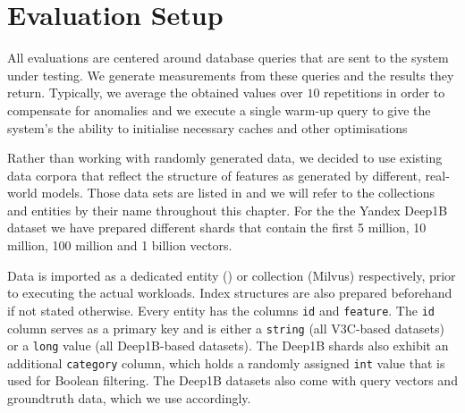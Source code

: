 \section{Evaluation Setup}

All evaluations are centered around database queries that are sent to the system under testing. We generate measurements from these queries and the results they return. Typically, we average the obtained values over $10$ repetitions in order to compensate for anomalies and we execute a single warm-up query to give the system's the ability to initialise necessary caches and other optimisations 

Rather than working with randomly generated data, we decided to use existing data corpora that reflect the structure of features as generated by different, real-world models. Those data sets are listed in  and we will refer to the collections and entities by their name throughout this chapter. For the the Yandex Deep1B \cite{Babenko:2016Efficient} dataset we have prepared different shards that contain the first 5 million, 10 million, 100 million and 1 billion vectors.

Data is imported as a dedicated entity (\cottontail{}) or collection (Milvus) respectively, prior to executing the actual workloads. Index structures are also prepared beforehand if not stated otherwise. Every entity has the columns \texttt{id} and \texttt{feature}. The \texttt{id} column serves as a primary key and is either a \texttt{string} (all V3C-based datasets) or a \texttt{long} value (all Deep1B-based datasets). The Deep1B shards also exhibit an additional \texttt{category} column, which holds a randomly assigned \texttt{int} value that is used for Boolean filtering. The Deep1B datasets also come with query vectors and groundtruth data, which we use accordingly.

